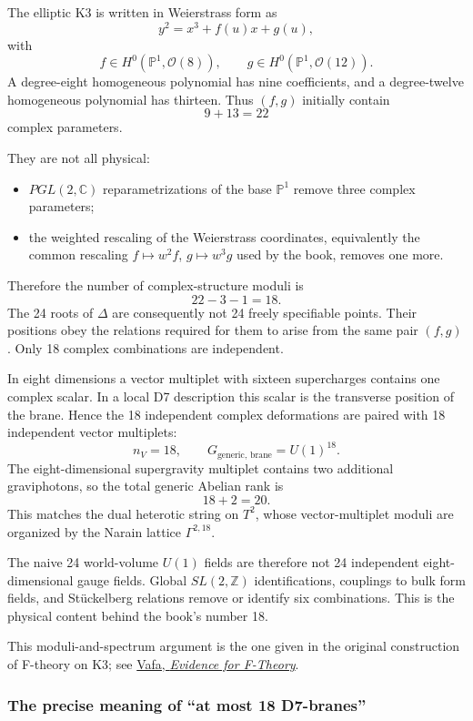 \documentclass[
  10pt,
  a4paper,
  openany]{book}
\providecommand{\tightlist}{%
  \setlength{\itemsep}{0pt}\setlength{\parskip}{0pt}}
\begin{document}
The elliptic K3 is written in Weierstrass form as \[
y^2=x^3+f(u)x+g(u),
\] with \[
f\in H^0(\mathbb P^1,\mathcal O(8)),
\qquad
g\in H^0(\mathbb P^1,\mathcal O(12)).
\] A degree-eight homogeneous polynomial has nine coefficients, and a
degree-twelve homogeneous polynomial has thirteen. Thus \((f,g)\)
initially contain \[
9+13=22
\] complex parameters.

They are not all physical:

\begin{itemize}
\tightlist
\item
  \(PGL(2,\mathbb C)\) reparametrizations of the base \(\mathbb P^1\)
  remove three complex parameters;
\item
  the weighted rescaling of the Weierstrass coordinates, equivalently
  the common rescaling \(f\mapsto w^2f\), \(g\mapsto w^3g\) used by the
  book, removes one more.
\end{itemize}

Therefore the number of complex-structure moduli is \[
\boxed{
22-3-1=18
}.
\] The 24 roots of \(\Delta\) are consequently not 24 freely specifiable
points. Their positions obey the relations required for them to arise
from the same pair \((f,g)\). Only 18 complex combinations are
independent.

In eight dimensions a vector multiplet with sixteen supercharges
contains one complex scalar. In a local D7 description this scalar is
the transverse position of the brane. Hence the 18 independent complex
deformations are paired with 18 independent vector multiplets: \[
\boxed{
n_V=18,
\qquad
G_{\mathrm{generic,\,brane}}=U(1)^{18}
}.
\] The eight-dimensional supergravity multiplet contains two additional
graviphotons, so the total generic Abelian rank is \[
18+2=20.
\] This matches the dual heterotic string on \(T^2\), whose
vector-multiplet moduli are organized by the Narain lattice
\(\Gamma^{2,18}\).

The naive 24 world-volume \(U(1)\) fields are therefore not 24
independent eight-dimensional gauge fields. Global \(SL(2,\mathbb Z)\)
identifications, couplings to bulk form fields, and Stückelberg
relations remove or identify six combinations. This is the physical
content behind the book's number 18.

This moduli-and-spectrum argument is the one given in the original
construction of F-theory on K3; see
\href{https://arxiv.org/abs/hep-th/9602022}{Vafa, \emph{Evidence for
F-Theory}}.

\subsubsection{The precise meaning of ``at most 18
D7-branes''}\label{the-precise-meaning-of-at-most-18-d7-branes}
\end{document}
